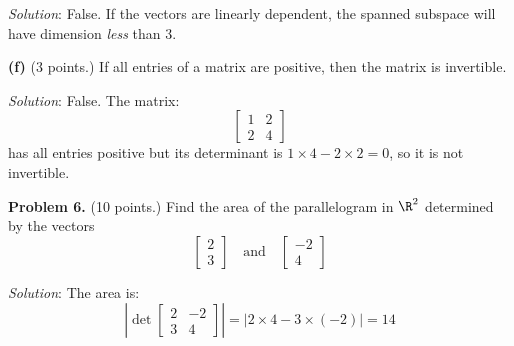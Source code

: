 \documentclass[12pt]{article}
\begin{document}
\emph{Solution}: False. If the vectors are linearly dependent, the spanned subspace will have dimension \emph{less} than $3$.
\proofend

\textbf{(f)} (3 points.) If all entries of a matrix are positive, then the matrix is invertible.

\emph{Solution}: False. The matrix:
\[
\begin{bmatrix}1&2\\2&4\end{bmatrix}
\]
has all entries positive but its determinant is $1\times4-2\times2=0$, so it is not invertible.
\proofend

\textbf{Problem 6.} (10 points.) Find the area of the parallelogram in $\R^2$ determined by the vectors
\[
\begin{bmatrix}2\\3\end{bmatrix}\quad\text{and}\quad\begin{bmatrix}-2\\4\end{bmatrix}
\]

\emph{Solution}: The area is:
\[
\left|
\det\begin{bmatrix}
2&-2\\3&4
\end{bmatrix}\right|=
|2\times4 - 3\times(-2)|=14
\]
\end{document}
